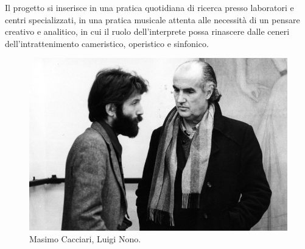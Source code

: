 \documentclass{gs-adonis}
\begin{document}
Il progetto si inserisce in una pratica quotidiana di ricerca presso laboratori
e centri specializzati, in una pratica musicale attenta alle necessità di un
pensare creativo e analitico, in cui il ruolo dell'interprete possa rinascere
dalle ceneri dell'intrattenimento cameristico, operistico e sinfonico.

\begin{figure}[t]
  \centering
  \includegraphics[width=\linewidth]{images/luigi-nono-massimo-cacciari.jpg}
  \captionsetup{width=.81\linewidth}
  \caption{Masimo Cacciari, Luigi Nono.}
  \label{cacciari}
\end{figure}


%
\end{document}

